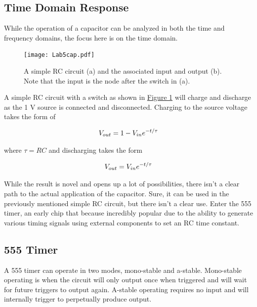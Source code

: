 \subsection{Time Domain Response}

While the operation of a capacitor can be analyzed in both the time and frequency domains, the focus here is on the time domain. 

\begin{figure}
	\centering
		\texttt{[image: Lab5cap.pdf]}
	\caption{A simple RC circuit (a) and the associated input and output (b). Note that the input is the node after the switch in (a).} \label{fig:capoutput}
\end{figure}

A simple RC circuit with a switch as shown in \hyperref[fig:capoutput]{Figure \ref*{fig:capoutput}} will charge and discharge as the 1 V source is connected and disconnected. Charging to the source voltage takes the form of 

\begin{equation}
	\centering
	V_{out} = 1 - V_{in}e^{-t/\tau}
\end{equation}

\noindent where $\tau = RC$ and discharging takes the form

\begin{equation}
	\centering
	V_{out} =  V_{in}e^{-t/\tau}
\end{equation}

\noindent While the result is novel and opens up a lot of possibilities, there isn't a clear path to the actual application of the capacitor. Sure, it can be used in the previously mentioned simple RC circuit, but there isn't a clear use. Enter the 555 timer, an early chip that because incredibly popular due to the ability to generate various timing signals using external components to set an RC time constant. 

\subsection{555 Timer}

A 555 timer can operate in two modes, mono-stable  and a-stable. Mono-stable operating is when the circuit will only output once when triggered and will wait for future triggers to output again. A-stable operating requires no input and will internally trigger to perpetually produce output. 

